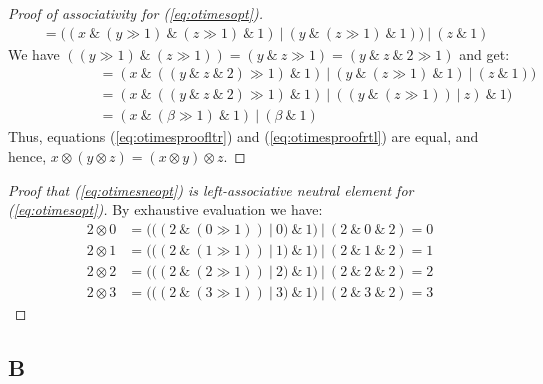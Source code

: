 \begin{proof}[Proof of associativity for (\ref{eq:otimesopt})]
\begin{align}
               &= ((x~\&~(y \gg 1)~\&~(z \gg 1)~\&~1)~|~(y~\&~(z \gg 1)~\&~1))~|~(z~\&~1)
\end{align}
We have $((y \gg 1)~\&~(z \gg 1)) = (y~\&~z \gg 1) = (y~\&~z~\&~2 \gg 1)$ and get:
\begin{align}
  &= (x~\&~((y~\&~z~\&~2) \gg 1)~\&~1)~|~(y~\&~(z \gg 1)~\&~1)~|~(z~\&~1))\\
  \phantom{((\alpha~\&~1)\&}&= (x~\&~((y~\&~z~\&~2) \gg 1)~\&~1)~|~((y~\&~(z \gg 1))~|~z)~\&~1)\\
  &= (x~\&~(\beta \gg 1)~\&~1)~|~(\beta~\&~1)
\end{align}
Thus, equations (\ref{eq:otimesproofltr}) and (\ref{eq:otimesproofrtl}) are equal, and hence, $x \otimes (y \otimes z) = (x \otimes y) \otimes z$.
\end{proof}

\begin{proof}[Proof that (\ref{eq:otimesneopt}) is left-associative neutral element for (\ref{eq:otimesopt})] By exhaustive evaluation we have:
\begin{align}
  \label{eq:otimesneproof}
  2 \otimes 0 &= (((2~\&~(0 \gg 1))~|~0)~\&~1)~|~(2~\&~0~\&~2) = 0 \\
  2 \otimes 1 &= (((2~\&~(1 \gg 1))~|~1)~\&~1)~|~(2~\&~1~\&~2) = 1 \\
  2 \otimes 2 &= (((2~\&~(2 \gg 1))~|~2)~\&~1)~|~(2~\&~2~\&~2) = 2 \\
  2 \otimes 3 &= (((2~\&~(3 \gg 1))~|~3)~\&~1)~|~(2~\&~3~\&~2) = 3
\end{align}
\end{proof}


\subsection*{B}
\label{app:B}


